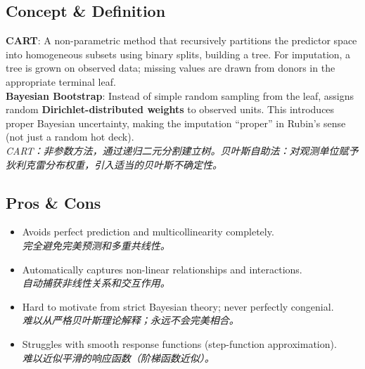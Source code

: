 \documentclass[9pt, a4paper]{article}
\begin{document}
\subsection{Concept \& Definition}
\begin{tcolorbox}[defbox]
    \textbf{CART}: A non-parametric method that recursively partitions the predictor space into homogeneous subsets using binary splits, building a tree. For imputation, a tree is grown on observed data; missing values are drawn from donors in the appropriate terminal leaf.\\[3pt]
    \textbf{Bayesian Bootstrap}: Instead of simple random sampling from the leaf, assigns random \textbf{Dirichlet-distributed weights} to observed units. This introduces proper Bayesian uncertainty, making the imputation ``proper'' in Rubin's sense (not just a random hot deck).\\
    \textit{CART：非参数方法，通过递归二元分割建立树。贝叶斯自助法：对观测单位赋予狄利克雷分布权重，引入适当的贝叶斯不确定性。}
\end{tcolorbox}

\subsection{Pros \& Cons}
\begin{tcolorbox}[prosbox]
    \begin{itemize}
        \item [\ding{51}] Avoids perfect prediction and multicollinearity completely.\\
        \textit{完全避免完美预测和多重共线性。}
        \item [\ding{51}] Automatically captures non-linear relationships and interactions.\\
        \textit{自动捕获非线性关系和交互作用。}
    \end{itemize}
\end{tcolorbox}
\begin{tcolorbox}[consbox]
    \begin{itemize}
        \item [\ding{55}] Hard to motivate from strict Bayesian theory; never perfectly congenial.\\
        \textit{难以从严格贝叶斯理论解释；永远不会完美相合。}
        \item [\ding{55}] Struggles with smooth response functions (step-function approximation).\\
        \textit{难以近似平滑的响应函数（阶梯函数近似）。}
    \end{itemize}
\end{tcolorbox}
\end{document}
